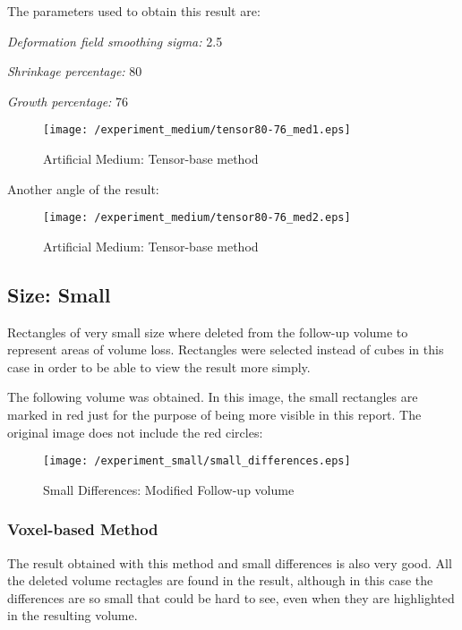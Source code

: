 The parameters used to obtain this result are:
\begin{description}
\item \textit{Deformation field smoothing sigma:} 2.5
\item \textit{Shrinkage percentage:} 80
\item \textit{Growth percentage:} 76
\end{description}

\begin{figure}[H]
  \centering
  \texttt{[image: /experiment\_medium/tensor80-76\_med1.eps]}
  \caption{Artificial Medium: Tensor-base method}
  \label{tensor_med1}
\end{figure}

Another angle of the result:

\begin{figure}[H]
  \centering
  \texttt{[image: /experiment\_medium/tensor80-76\_med2.eps]}
  \caption{Artificial Medium: Tensor-base method}
  \label{tensor_med2}
\end{figure}

\subsection{Size: Small}
Rectangles of very small size where deleted from the follow-up volume
to represent areas of volume loss. Rectangles were selected instead of
cubes in this case in order to be able to view the result more simply.

The following volume was obtained. In this image, the small rectangles
are marked in red just for the purpose of being more visible in this
report. The original image does not include the red circles:

\begin{figure}[H]
  \centering
  \texttt{[image: /experiment\_small/small\_differences.eps]}
  \caption{Small Differences: Modified Follow-up volume}
  \label{smallB}
\end{figure}

\subsubsection{Voxel-based Method}
The result obtained with this method and small differences is also
very good. All the deleted volume rectagles are found in the result,
although in this case the differences are so small that could be hard
to see, even when they are highlighted in the resulting volume.

